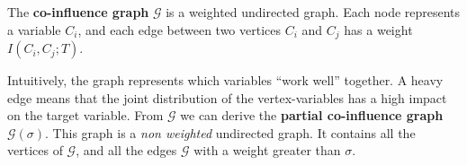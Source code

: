 \begin{definition}
    The \textbf{co-influence graph} $\mathcal{G}$ is a weighted undirected
    graph. Each node represents a variable $C_i$, and each edge between two
    vertices $C_i$ and $C_j$ has a weight $I(C_i, C_j ; T)$.
\end{definition}


Intuitively, the graph represents which variables ``work well'' together. A
heavy edge means that the joint distribution of the vertex-variables has a high impact on
the target variable. From $\mathcal{G}$ we can derive the \textbf{partial
co-influence graph} $\mathcal{G}(\sigma)$. This graph is a \emph{non weighted}
undirected graph. It contains all the vertices of $\mathcal{G}$, and all the
edges $\mathcal{G}$ with a weight greater than $\sigma$.
